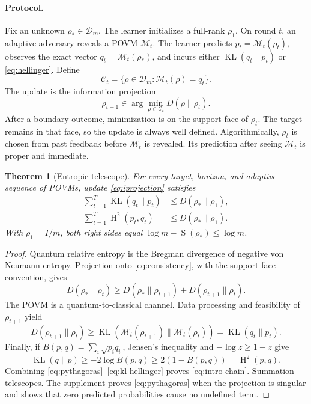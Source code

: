 \documentclass[twoside]{article}
\newtheorem{theorem}{Theorem}
\newcommand{\Dens}{\mathcal D}
\newcommand{\M}{\mathcal M}
\newcommand{\C}{\mathcal C}
\newcommand{\KL}{\operatorname{KL}}
\newcommand{\Hsq}{\operatorname{H}^2}
\newcommand{\Ent}{\operatorname{S}}
\begin{document}
\paragraph{Protocol.} Fix an unknown $\rho_*\in\Dens_m$. The learner initializes a full-rank $\rho_1$. On round $t$, an adaptive adversary reveals a POVM $\M_t$. The learner predicts $p_t=\M_t(\rho_t)$, observes the exact vector $q_t=\M_t(\rho_*)$, and incurs either $\KL(q_t\|p_t)$ or \eqref{eq:hellinger}. Define
\begin{equation}
\C_t=\{\rho\in\Dens_m:\M_t(\rho)=q_t\}.
\label{eq:consistency}
\end{equation}
The update is the information projection
\begin{equation}
\rho_{t+1}\in\arg\min_{\rho\in\C_t}D(\rho\|\rho_t).
\label{eq:iprojection}
\end{equation}
After a boundary outcome, minimization is on the support face of $\rho_t$. The target remains in that face, so the update is always well defined. Algorithmically, $\rho_t$ is chosen from past feedback before $\M_t$ is revealed. Its prediction after seeing $\M_t$ is proper and immediate.

\begin{theorem}[Entropic telescope]
\label{thm:telescope}
For every target, horizon, and adaptive sequence of POVMs, update \eqref{eq:iprojection} satisfies
\begin{align}
\sum_{t=1}^T\KL(q_t\|p_t)&\leq D(\rho_*\|\rho_1),
\label{eq:kl-telescope}\\
\sum_{t=1}^T\Hsq(p_t,q_t)&\leq D(\rho_*\|\rho_1).
\label{eq:h-telescope}
\end{align}
With $\rho_1=I/m$, both right sides equal $\log m-\Ent(\rho_*)\leq\log m$.
\end{theorem}

\begin{proof}
Quantum relative entropy is the Bregman divergence of negative von Neumann entropy. Projection onto \eqref{eq:consistency}, with the support-face convention, gives
\begin{equation}
D(\rho_*\|\rho_t)\geq D(\rho_*\|\rho_{t+1})+D(\rho_{t+1}\|\rho_t).
\label{eq:pythagoras}
\end{equation}
The POVM is a quantum-to-classical channel. Data processing and feasibility of $\rho_{t+1}$ yield
\begin{equation}
D(\rho_{t+1}\|\rho_t)\geq
\KL(\M_t(\rho_{t+1})\|\M_t(\rho_t))
=\KL(q_t\|p_t).
\label{eq:data-processing}
\end{equation}
Finally, if $B(p,q)=\sum_i\sqrt{p_iq_i}$, Jensen's inequality and $-\log z\geq1-z$ give
\begin{equation}
\KL(q\|p)\geq-2\log B(p,q)\geq2(1-B(p,q))=\Hsq(p,q).
\label{eq:kl-hellinger}
\end{equation}
Combining \eqref{eq:pythagoras}--\eqref{eq:kl-hellinger} proves \eqref{eq:intro-chain}. Summation telescopes. The supplement proves \eqref{eq:pythagoras} when the projection is singular and shows that zero predicted probabilities cause no undefined term.
\end{proof}
\end{document}

